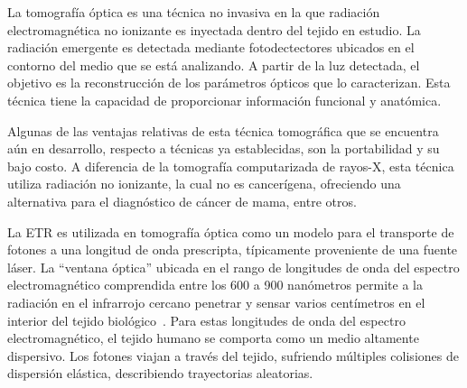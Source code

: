  La tomografía óptica es una técnica no invasiva en la que
 radiación electromagnética no ionizante es inyectada dentro del tejido en estudio.
 La radiación emergente es detectada mediante fotodectectores 
 ubicados en el contorno del medio que se está analizando. A
  partir de la luz detectada, el objetivo es la reconstrucción de
 los parámetros ópticos que lo caracterizan. Esta técnica 
 tiene la capacidad de proporcionar información funcional y anatómica. 
 
 Algunas de las ventajas relativas de esta técnica tomográfica que se encuentra aún en desarrollo, respecto a 
 técnicas ya establecidas, son la portabilidad y su bajo costo. 
A diferencia de la tomografía 
 computarizada de rayos-X, esta técnica utiliza radiación no 
 ionizante, la cual no es cancerígena, ofreciendo 
 una alternativa para el diagnóstico de cáncer de mama, entre otros. 
 
 La ETR es utilizada 
 en tomografía óptica como
 un modelo para el transporte de fotones a una longitud de onda prescripta, 
 típicamente proveniente de una fuente láser.
 La ``ventana óptica'' ubicada en el rango de longitudes de onda del espectro electromagnético comprendida entre los 600 a 900 nanómetros permite a la radiación en el 
 infrarrojo cercano penetrar y sensar varios centímetros en el interior del tejido biológico~\cite{Boas2001}. 
 Para estas longitudes de onda del espectro electromagnético, el tejido humano se comporta 
 como un medio altamente dispersivo. Los fotones viajan a través del
 tejido, sufriendo múltiples colisiones de dispersión elástica, describiendo trayectorias 
aleatorias.

